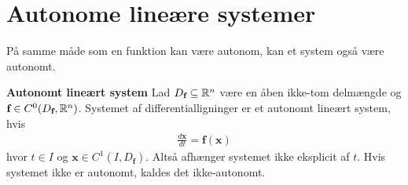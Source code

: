 \section{Autonome lineære systemer}
På samme måde som en funktion kan være autonom, kan et system også være autonomt.

\begin{minipage}\textwidth
\begin{defn}\textbf{Autonomt lineært system} %
\newline
Lad $D_\textbf{f} \subseteq \mathbb{R}^n$ være en åben ikke-tom delmængde og $\textbf{f}\in C^0(D_\textbf{f},\mathbb{R}^n)$. Systemet af differentialligninger er et autonomt lineært system, hvis
\begin{align*}
    \frac{d\textbf{x}}{dt} = \textbf{f}(\textbf{x})
\end{align*}
hvor $t \in I$ og $\textbf{x}\in C^1(I, D_\textbf{f})$. Altså afhænger systemet ikke eksplicit af $t$. Hvis systemet ikke er autonomt, kaldes det ikke-autonomt. 
\end{defn}
\end{minipage}





